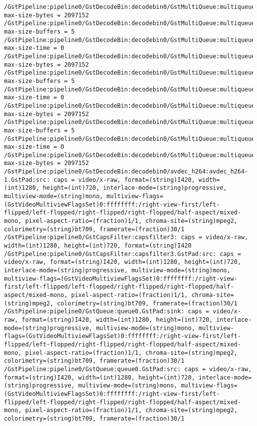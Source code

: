 \documentclass[12pt,oneside]{book}
\begin{document}
\begin{lstlisting}
/GstPipeline:pipeline0/GstDecodeBin:decodebin0/GstMultiQueue:multiqueue0: max-size-bytes = 2097152
/GstPipeline:pipeline0/GstDecodeBin:decodebin0/GstMultiQueue:multiqueue0: max-size-buffers = 5
/GstPipeline:pipeline0/GstDecodeBin:decodebin0/GstMultiQueue:multiqueue0: max-size-time = 0
/GstPipeline:pipeline0/GstDecodeBin:decodebin0/GstMultiQueue:multiqueue0: max-size-bytes = 2097152
/GstPipeline:pipeline0/GstDecodeBin:decodebin0/GstMultiQueue:multiqueue0: max-size-buffers = 5
/GstPipeline:pipeline0/GstDecodeBin:decodebin0/GstMultiQueue:multiqueue0: max-size-time = 0
/GstPipeline:pipeline0/GstDecodeBin:decodebin0/GstMultiQueue:multiqueue0: max-size-bytes = 2097152
/GstPipeline:pipeline0/GstDecodeBin:decodebin0/GstMultiQueue:multiqueue0: max-size-buffers = 5
/GstPipeline:pipeline0/GstDecodeBin:decodebin0/GstMultiQueue:multiqueue0: max-size-time = 0
/GstPipeline:pipeline0/GstDecodeBin:decodebin0/GstMultiQueue:multiqueue0: max-size-bytes = 2097152
/GstPipeline:pipeline0/GstDecodeBin:decodebin0/avdec_h264:avdec_h264-1.GstPad:src: caps = video/x-raw, format=(string)I420, width=(int)1280, height=(int)720, interlace-mode=(string)progressive, multiview-mode=(string)mono, multiview-flags=(GstVideoMultiviewFlagsSet)0:ffffffff:/right-view-first/left-flipped/left-flopped/right-flipped/right-flopped/half-aspect/mixed-mono, pixel-aspect-ratio=(fraction)1/1, chroma-site=(string)mpeg2, colorimetry=(string)bt709, framerate=(fraction)30/1
/GstPipeline:pipeline0/GstCapsFilter:capsfilter3: caps = video/x-raw, width=(int)1280, height=(int)720, format=(string)I420
/GstPipeline:pipeline0/GstCapsFilter:capsfilter3.GstPad:src: caps = video/x-raw, format=(string)I420, width=(int)1280, height=(int)720, interlace-mode=(string)progressive, multiview-mode=(string)mono, multiview-flags=(GstVideoMultiviewFlagsSet)0:ffffffff:/right-view-first/left-flipped/left-flopped/right-flipped/right-flopped/half-aspect/mixed-mono, pixel-aspect-ratio=(fraction)1/1, chroma-site=(string)mpeg2, colorimetry=(string)bt709, framerate=(fraction)30/1
/GstPipeline:pipeline0/GstQueue:queue0.GstPad:sink: caps = video/x-raw, format=(string)I420, width=(int)1280, height=(int)720, interlace-mode=(string)progressive, multiview-mode=(string)mono, multiview-flags=(GstVideoMultiviewFlagsSet)0:ffffffff:/right-view-first/left-flipped/left-flopped/right-flipped/right-flopped/half-aspect/mixed-mono, pixel-aspect-ratio=(fraction)1/1, chroma-site=(string)mpeg2, colorimetry=(string)bt709, framerate=(fraction)30/1
/GstPipeline:pipeline0/GstQueue:queue0.GstPad:src: caps = video/x-raw, format=(string)I420, width=(int)1280, height=(int)720, interlace-mode=(string)progressive, multiview-mode=(string)mono, multiview-flags=(GstVideoMultiviewFlagsSet)0:ffffffff:/right-view-first/left-flipped/left-flopped/right-flipped/right-flopped/half-aspect/mixed-mono, pixel-aspect-ratio=(fraction)1/1, chroma-site=(string)mpeg2, colorimetry=(string)bt709, framerate=(fraction)30/1

\end{lstlisting}
\end{document}
